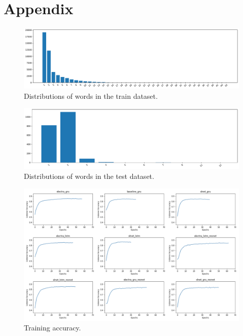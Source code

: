 \section{Appendix}
\label{sec:appendix}

\begin{figure}[htb!]
  \centering
  \includegraphics[width=\textwidth]{assets/trainset_words.pdf}
  \caption[Train dataset words]{Distributions of words in the train dataset.}
  \label{figure:trainset-words}
\end{figure}

\begin{figure}[htb!]
  \centering
  \includegraphics[width=\textwidth]{assets/testset_words.pdf}
  \caption[Test dataset words]{Distributions of words in the test dataset.}
  \label{figure:testset-words}
\end{figure}

\begin{figure}[htb!]
  \centering
  \includegraphics[width=\textwidth]{assets/training_accuracy.png}
  \caption[Training Accuracy]{Training accuracy.}
  \label{figure:training-accuracy}
\end{figure}

